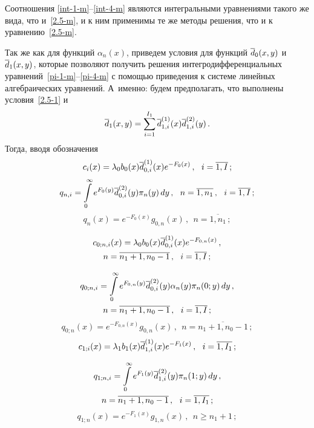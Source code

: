 \begin{multicols}{2}
Соотношения \eqref{int-1-m}--\eqref{int-4-m} являются
интегральными уравнениями такого же вида, что и~\eqref{2.5-m},
и к ним применимы те же методы решения, что и
к уравнению~\eqref{2.5-m}.

Так же как для функций $\alpha_n(x)$, приведем условия
для функций $\overline d_0(x,y)$ и $\overline d_1(x,y)$, которые поз\-во\-ляют
получить решения ин\-тег\-ро\-диф\-фе\-рен\-ци\-аль\-ных уравнений~\eqref{pi-1-m}--\eqref{pi-4-m}
с помощью приведения к системе линейных алгебраических уравнений.
А~именно: будем предполагать, что выполнены условия~\eqref{2.5-1} и
\begin{equation}
\label{2.5-2-m}
\overline d_1(x,y) = \sum\limits_{i=1}^{I_1} \overline d^{(1)}_{1,i}(x) \overline d^{(2)}_{1,i}(y) \,.
\end{equation}
Тогда, вводя обозначения
$$
c_i(x) = \lambda_0 b_0(x) \overline d^{(1)}_{0,i}(x) e^{-F_0(x)}\,,\ \ i=\overline{1,I}\,;
$$
$$
q_{n,i} = \int\limits_0^\infty e^{F_0(y)} \d^{(2)}_{0,i}(y) \pi_n(y)\, dy \,,\ \ 
n=\overline{1,n_1}\,,
\ \ i=\overline{1,I}\,;
$$
$$
q_{n}(x)= e^{-F_0(x)} g_{0,n}(x)\,,
\ \ n=\overline{1,n_1}\,;
$$

\vspace*{-12pt}

\noindent
\begin{multline*}
c_{0;n,i}(x)= \lambda_0 b_0(x) \overline d^{(1)}_{0,i}(x) e^{-F_{0,n}(x)}\,,\\
n=\overline{n_1+1,n_0-1}\, ,\ \ i=\overline{1,I}\,;
\end{multline*}

\vspace*{-12pt}

\noindent
\begin{multline*}
q_{0;n,i}= \int\limits_0^\infty e^{F_{0,n}(y)} \overline d^{(2)}_{0,i}(y) \alpha_n(y) \pi_n(0;y)\, dy\,,
\\ n=\overline{n_1+1,n_0-1}\,,
\ \ i=\overline{1,I}\,;
\end{multline*}
$$ 
q_{0;n}(x) = e^{-F_{0,n}(x)} g_{0,n}(x) \,, \ \ n=\overline{n_1+1,n_0-1}\,;
$$
$$
c_{1;i}(x)= \lambda_1 b_1(x) \overline d^{(1)}_{1,i}(x) e^{-F_{1}(x)}\,,\ \ i=\overline{1,I_1}\,;
$$

\vspace*{-12pt}

\noindent
\begin{multline*}
q_{1;n,i}= \int\limits_0^\infty e^{F_{1}(y)} \overline d^{(2)}_{1,i}(y) \pi_n(1;y)\, dy\,,\\ 
n=\overline{n_1+1,n_0-1}\,,
\ \ i=\overline{1,I_1}\,    ;
\end{multline*}
$$
q_{1;n}(x)= e^{-F_{1}(x)} g_{1,n}(x)\,,
\ \ n\ge n_1+1\,;
$$


\end{multicols}
